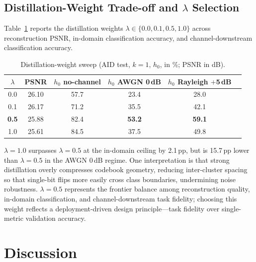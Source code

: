\documentclass[lettersize,journal]{IEEEtran}
\begin{document}
\subsection{Distillation-Weight Trade-off and $\lambda$ Selection}
\label{sec:exp-tradeoff}

Table~\ref{tab:lambda} reports the distillation weights $\lambda\in\{0.0, 0.1, 0.5, 1.0\}$ across reconstruction PSNR, in-domain classification accuracy, and channel-downstream classification accuracy.

\begin{table}[!t]
\centering
\caption{Distillation-weight sweep (AID test, $k{=}1$, $h_0$, in \%; PSNR in dB).}
\label{tab:lambda}
\begin{tabular}{@{}cccccc@{}}
\toprule
$\lambda$ & PSNR & $h_0$ no-channel & $h_0$ AWGN 0\,dB & $h_0$ Rayleigh $+$5\,dB \\ \midrule
0.0 & 26.10 & 57.7 & 23.4 & 28.0 \\
0.1 & 26.17 & 71.2 & 35.5 & 42.1 \\
\textbf{0.5} & 25.88 & 82.4 & \textbf{53.2} & \textbf{59.1} \\
1.0 & 25.61 & 84.5 & 37.5 & 49.8 \\ \bottomrule
\end{tabular}
\end{table}

$\lambda = 1.0$ surpasses $\lambda=0.5$ at the in-domain ceiling by 2.1\,pp, but is 15.7\,pp lower than $\lambda=0.5$ in the AWGN 0\,dB regime. One interpretation is that strong distillation overly compresses codebook geometry, reducing inter-cluster spacing so that single-bit flips more easily cross class boundaries, undermining noise robustness. $\lambda=0.5$ represents the frontier balance among reconstruction quality, in-domain classification, and channel-downstream task fidelity; choosing this weight reflects a deployment-driven design principle---task fidelity over single-metric validation accuracy.

\section{Discussion}
\end{document}

